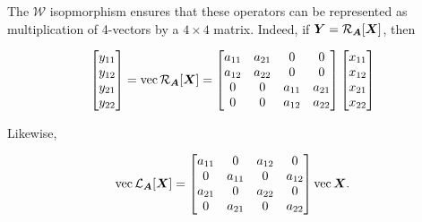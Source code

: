 \documentclass[useAMS,usenatbib]{mn2e}
\newcommand{\mat}[1]{{\bmath{#1}}}
\begin{document}
The $\mathcal{W}$ isopmorphism ensures that these operators can be represented as multiplication of 4-vectors 
by a $4\times4$ matrix. Indeed, if $\mat{Y}=\Rop{\mat{A}}[\mat{X}]$, then 

\begin{equation}
\Matrix{c}{y_{11}\\y_{12}\\y_{21}\\y_{22}} = \VEC{\Rop{\mat{A}}[\mat{X}]} = 
\Matrix{cccc}{a_{11}&a_{21}&0&0 \\ a_{12}&a_{22}&0&0 \\ 0&0&a_{11}&a_{21} \\ 0&0&a_{12}&a_{22} }
\Matrix{c}{x_{11}\\x_{12}\\x_{21}\\x_{22}} 
\end{equation}

Likewise, 

\begin{equation}
\VEC{\Lop{\mat{A}}[\mat{X}]} = 
\Matrix{cccc}{a_{11}&0&a_{12}&0 \\ 0&a_{11}&0&a_{12} \\ a_{21}&0&a_{22}&0  \\ 0&a_{21}&0&a_{22} }
\VEC{\mat{X}}.
\end{equation}




\end{document}
